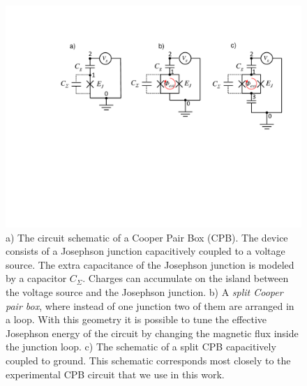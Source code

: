 \begin{figure}
	\centering
	\includegraphics[width=\textwidth]{"./material/figures/introduction/cooper_pair_box"}
	\caption{a) The circuit schematic of a Cooper Pair Box (CPB). The device consists of a Josephson junction capacitively coupled to a voltage source. The extra capacitance of the Josephson junction is modeled by a capacitor $C_\Sigma$. Charges can accumulate on the island between the voltage source and the Josephson junction. b) A {\it split Cooper pair box}, where instead of one junction two of them are arranged in a loop. With this geometry it is possible to tune the effective Josephson energy of the circuit by changing the magnetic flux inside the junction loop. c) The schematic of a split CPB capacitively coupled to ground. This schematic corresponds most closely to the experimental CPB circuit that we use in this work.}
	\label{fig:cpb_circuit}
\end{figure}

